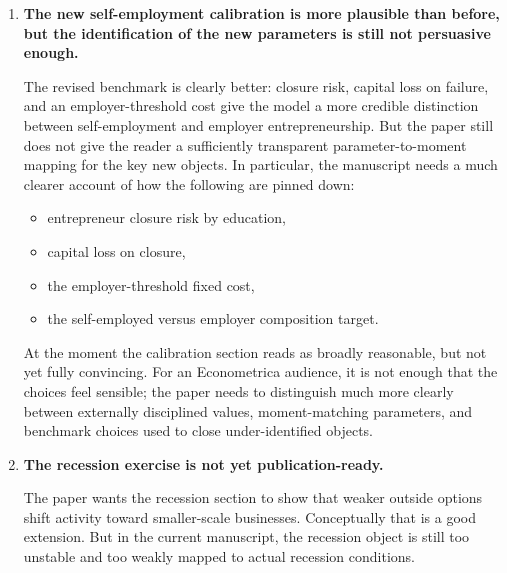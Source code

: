 \documentclass[11pt]{article}
\begin{document}
\begin{enumerate}[leftmargin=*,label=\textbf{\arabic*.}]
The draft is aware of this issue, but the interpretation still does not isolate
the mechanism cleanly enough. The fixed-tax comparison is therefore not a minor
robustness check. It is central to the paper's interpretation of the no-UI and
low-UI counterfactuals. Without a clean separation of these channels, the
reader cannot tell how much of the result reflects necessity entry per se and
how much reflects the fiscal consequences of changing the insurance system.

I would not be comfortable with publication in a journal of this level until the
paper treats this decomposition as part of the core evidence rather than as
appendix support.

\item \textbf{The new self-employment calibration is more plausible than before,
but the identification of the new parameters is still not persuasive enough.}

The revised benchmark is clearly better: closure risk, capital loss on failure,
and an employer-threshold cost give the model a more credible distinction
between self-employment and employer entrepreneurship. But the paper still does
not give the reader a sufficiently transparent parameter-to-moment mapping for
the key new objects. In particular, the manuscript needs a much clearer account
of how the following are pinned down:

\begin{itemize}[leftmargin=*]
\item entrepreneur closure risk by education,
\item capital loss on closure,
\item the employer-threshold fixed cost,
\item the self-employed versus employer composition target.
\end{itemize}

At the moment the calibration section reads as broadly reasonable, but not yet
fully convincing. For an Econometrica audience, it is not enough that the
choices feel sensible; the paper needs to distinguish much more clearly between
externally disciplined values, moment-matching parameters, and benchmark choices
used to close under-identified objects.

\item \textbf{The recession exercise is not yet publication-ready.}

The paper wants the recession section to show that weaker outside options shift
activity toward smaller-scale businesses. Conceptually that is a good extension.
But in the current manuscript, the recession object is still too unstable and
too weakly mapped to actual recession conditions.


\end{enumerate}
\end{document}
